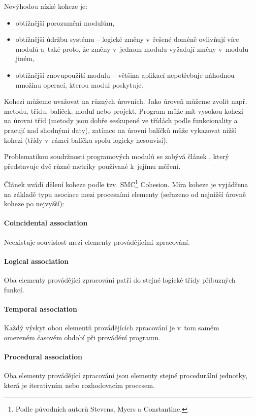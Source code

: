 Nevýhodou nízké koheze je:
\begin{itemize}
\item obtížnější porozumění modulům,
\item obtížnější údržbu systému -- logické změny v~řešené doméně ovlivňují více modulů a~také proto, že změny v~jednom modulu vyžadují změny v~modulu jiném,
\item obtížnější znovupoužití modulu -- většina aplikací nepotřebuje náhodnou množinu operací, kterou modul poskytuje.
\end{itemize}

Kohezi můžeme uvažovat na různých úrovních. Jako úroveň můžeme zvolit např. metodu, třídu, balíček, modul nebo projekt. Program může mít vysokou kohezi na úrovni tříd (metody jsou dobře seskupené ve třídách podle funkcionality a pracují nad shodnými daty), zatímco na úrovni balíčků může vykazovat nižší kohezi (třídy v~rámci balíčku spolu logicky nesouvisí).

Problematikou soudržnosti programových modulů se zabývá článek \cite{Kang:1996:DCM:872750.873361}, který představuje dvě různé metriky používané k~jejímu měření.

Článek \cite{ISI:000079726000029} uvádí dělení koheze podle tzv. SMC\footnote{Podle původních autorů Stevens, Myers a Constantine.} Cohesion. Míra koheze je vyjádřena na základě typu asociace mezi procesními elementy (seřazeno od nejnižší úrovně koheze po nejvyšší):

\paragraph{Coincidental association} Neexistuje souvislost mezi elementy provádějícími zpracování.

\paragraph{Logical association} Oba elementy provádějící zpracování patří do stejné logické třídy příbuzných funkcí.

\paragraph{Temporal association} Každý výskyt obou elementů provádějících zpracování je v~tom samém omezeném časovém období při provádění programu.

\paragraph{Procedural association} Oba elementy provádějící zpracování jsou elementy stejné procedurální jednotky, která je iterativním nebo rozhodovacím procesem.

